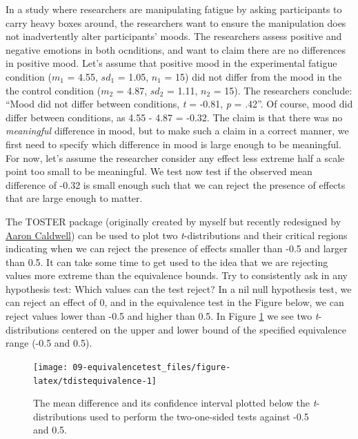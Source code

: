 \documentclass[
  oneside]{book}
\begin{document}
In a study where researchers are manipulating fatigue by asking participants to carry heavy boxes around, the researchers want to ensure the manipulation does not inadvertently alter participants' moods. The researchers assess positive and negative emotions in both ocnditions, and want to claim there are no differences in positive mood. Let's assume that positive mood in the experimental fatigue condition (\(m_1\) = 4.55, \(sd_1\) = 1.05, \(n_1\) = 15) did not differ from the mood in the the control condition (\(m_2\) = 4.87, \(sd_2\) = 1.11, \(n_2\) = 15). The researchers conclude: ``Mood did not differ between conditions, \emph{t} = -0.81, \emph{p} = .42''. Of course, mood did differ between conditions, as 4.55 - 4.87 = -0.32. The claim is that there was no \emph{meaningful} difference in mood, but to make such a claim in a correct manner, we first need to specify which difference in mood is large enough to be meaningful. For now, let's assume the researcher consider any effect less extreme half a scale point too small to be meaningful. We test now test if the observed mean difference of -0.32 is small enough such that we can reject the presence of effects that are large enough to matter.

The TOSTER package (originally created by myself but recently redesigned by \href{https://aaroncaldwell.us/}{Aaron Caldwell}) can be used to plot two \emph{t}-distributions and their critical regions indicating when we can reject the presence of effects smaller than -0.5 and larger than 0.5. It can take some time to get used to the idea that we are rejecting values more extreme than the equivalence bounds. Try to consistently ask in any hypothesis test: Which values can the test reject? In a nil null hypothesis test, we can reject an effect of 0, and in the equivalence test in the Figure below, we can reject values lower than -0.5 and higher than 0.5. In Figure \ref{fig:tdistequivalence} we see two \emph{t}-distributions centered on the upper and lower bound of the specified equivalence range (-0.5 and 0.5).



\begin{figure}

{\centering \texttt{[image: 09-equivalencetest\_files/figure-latex/tdistequivalence-1]} 

}

\caption{The mean difference and its confidence interval plotted below the \emph{t}-distributions used to perform the two-one-sided tests against -0.5 and 0.5.}\label{fig:tdistequivalence}
\end{figure}
\end{document}

